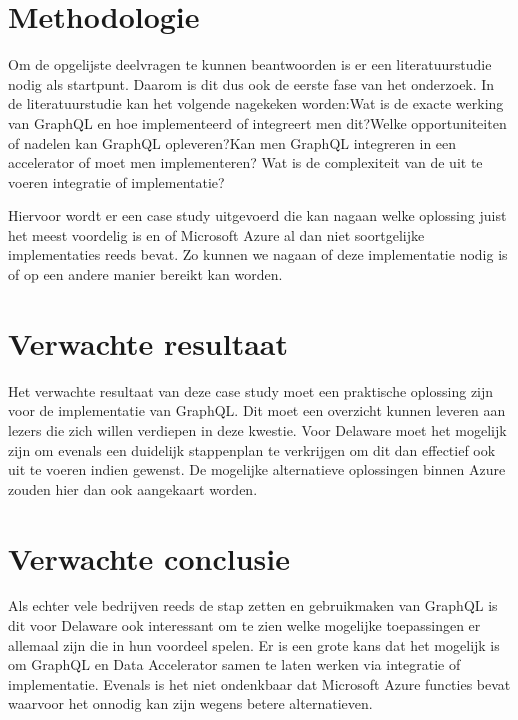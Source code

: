 \section{Methodologie}%
\label{sec:methodologie}

Om de opgelijste deelvragen te kunnen beantwoorden is er een literatuurstudie nodig als startpunt. Daarom is dit dus ook de eerste fase van het onderzoek. In de literatuurstudie kan het volgende nagekeken worden:\newline Wat is de exacte werking van GraphQL en hoe implementeerd of integreert men dit?\newline Welke opportuniteiten of nadelen kan GraphQL opleveren?\newline Kan men GraphQL integreren in een accelerator of moet men implementeren? \newline Wat is de complexiteit van de uit te voeren integratie of implementatie?

Hiervoor wordt er een case study uitgevoerd die kan nagaan welke oplossing juist het meest voordelig is en of Microsoft Azure al dan niet soortgelijke implementaties reeds bevat. Zo kunnen we nagaan of deze implementatie nodig is of op een andere manier bereikt kan worden.

\section{Verwachte resultaat}
\label{sec:verwachte resultaat}
Het verwachte resultaat van deze case study moet een praktische oplossing zijn voor de implementatie van GraphQL. Dit moet een overzicht kunnen leveren aan lezers die zich willen verdiepen in deze kwestie. Voor Delaware moet het mogelijk zijn om evenals een duidelijk stappenplan te verkrijgen om dit dan effectief ook uit te voeren indien gewenst. De mogelijke alternatieve oplossingen binnen Azure zouden hier dan ook aangekaart worden.

\section{Verwachte conclusie}
\label{sec:verwachte conclusiet}
Als echter vele bedrijven reeds de stap zetten en gebruikmaken van GraphQL is dit voor Delaware ook interessant om te zien welke mogelijke toepassingen er allemaal zijn die in hun voordeel spelen. Er is een grote kans dat het mogelijk is om GraphQL en Data Accelerator samen te laten werken via integratie of implementatie. Evenals is het niet ondenkbaar dat Microsoft Azure functies bevat waarvoor het onnodig kan zijn wegens betere alternatieven.


